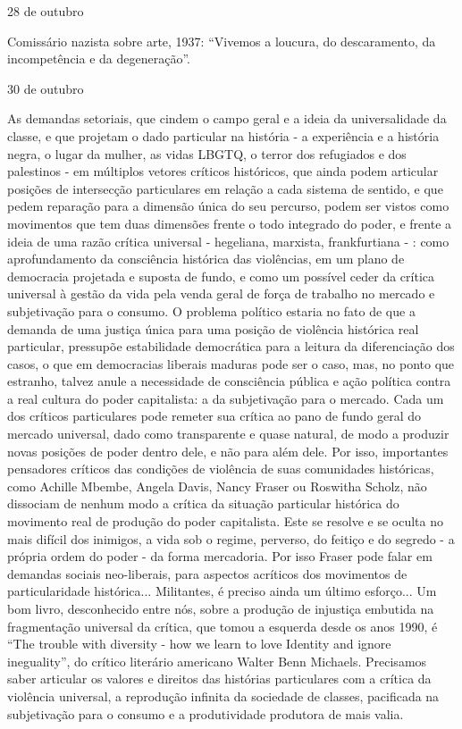 28 de outubro

Comissário nazista sobre arte, 1937: ``Vivemos a loucura, do
descaramento, da incompetência e da degeneração''.

30 de outubro

As demandas setoriais, que cindem o campo geral e a ideia da
universalidade da classe, e que projetam o dado particular na história -
a experiência e a história negra, o lugar da mulher, as vidas LBGTQ, o
terror dos refugiados e dos palestinos - em múltiplos vetores críticos
históricos, que ainda podem articular posições de intersecção
particulares em relação a cada sistema de sentido, e que pedem reparação
para a dimensão única do seu percurso, podem ser vistos como movimentos
que tem duas dimensões frente o todo integrado do poder, e frente a
ideia de uma razão crítica universal - hegeliana, marxista,
frankfurtiana - : como aprofundamento da consciência histórica das
violências, em um plano de democracia projetada e suposta de fundo, e
como um possível ceder da crítica universal à gestão da vida pela venda
geral de força de trabalho no mercado e subjetivação para o consumo. O
problema político estaria no fato de que a demanda de uma justiça única
para uma posição de violência histórica real particular, pressupõe
estabilidade democrática para a leitura da diferenciação dos casos, o
que em democracias liberais maduras pode ser o caso, mas, no ponto que
estranho, talvez anule a necessidade de consciência pública e ação
política contra a real cultura do poder capitalista: a da subjetivação
para o mercado. Cada um dos críticos particulares pode remeter sua
crítica ao pano de fundo geral do mercado universal, dado como
transparente e quase natural, de modo a produzir novas posições de poder
dentro dele, e não para além dele. Por isso, importantes pensadores
críticos das condições de violência de suas comunidades históricas, como
Achille Mbembe, Angela Davis, Nancy Fraser ou Roswitha Scholz, não
dissociam de nenhum modo a crítica da situação particular histórica do
movimento real de produção do poder capitalista. Este se resolve e se
oculta no mais difícil dos inimigos, a vida sob o regime, perverso, do
feitiço e do segredo - a própria ordem do poder - da forma mercadoria.
Por isso Fraser pode falar em demandas sociais neo-liberais, para
aspectos acríticos dos movimentos de particularidade histórica...
Militantes, é preciso ainda um último esforço... Um bom livro,
desconhecido entre nós, sobre a produção de injustiça embutida na
fragmentação universal da crítica, que tomou a esquerda desde os anos
1990, é ``The trouble with diversity - how we learn to love Identity and
ignore ineguality'', do crítico literário americano Walter Benn
Michaels. Precisamos saber articular os valores e direitos das histórias
particulares com a crítica da violência universal, a reprodução infinita
da sociedade de classes, pacificada na subjetivação para o consumo e a
produtividade produtora de mais valia.


